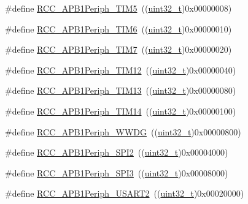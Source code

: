\begin{DoxyCompactItemize}
\item 
\#define \hyperlink{group___a_p_b1__peripheral_ga4905c26000a571fa01fc057fe31d254a}{R\+C\+C\+\_\+\+A\+P\+B1\+Periph\+\_\+\+T\+I\+M5}~((\hyperlink{_p_e___types_8h_a33594304e786b158f3fb30289278f5af}{uint32\+\_\+t})0x00000008)
\item 
\#define \hyperlink{group___a_p_b1__peripheral_ga4974e8b8f11d54fbc0bac1988ff6254c}{R\+C\+C\+\_\+\+A\+P\+B1\+Periph\+\_\+\+T\+I\+M6}~((\hyperlink{_p_e___types_8h_a33594304e786b158f3fb30289278f5af}{uint32\+\_\+t})0x00000010)
\item 
\#define \hyperlink{group___a_p_b1__peripheral_ga9415b0c46db5318bdee3f868c16b8d35}{R\+C\+C\+\_\+\+A\+P\+B1\+Periph\+\_\+\+T\+I\+M7}~((\hyperlink{_p_e___types_8h_a33594304e786b158f3fb30289278f5af}{uint32\+\_\+t})0x00000020)
\item 
\#define \hyperlink{group___a_p_b1__peripheral_ga0a4ec40233160ca20adaa571073e7bcd}{R\+C\+C\+\_\+\+A\+P\+B1\+Periph\+\_\+\+T\+I\+M12}~((\hyperlink{_p_e___types_8h_a33594304e786b158f3fb30289278f5af}{uint32\+\_\+t})0x00000040)
\item 
\#define \hyperlink{group___a_p_b1__peripheral_ga34397b722f46f31e898136fb51a7523a}{R\+C\+C\+\_\+\+A\+P\+B1\+Periph\+\_\+\+T\+I\+M13}~((\hyperlink{_p_e___types_8h_a33594304e786b158f3fb30289278f5af}{uint32\+\_\+t})0x00000080)
\item 
\#define \hyperlink{group___a_p_b1__peripheral_ga7100c45768eea1484f6fd519b53e287d}{R\+C\+C\+\_\+\+A\+P\+B1\+Periph\+\_\+\+T\+I\+M14}~((\hyperlink{_p_e___types_8h_a33594304e786b158f3fb30289278f5af}{uint32\+\_\+t})0x00000100)
\item 
\#define \hyperlink{group___a_p_b1__peripheral_gad84e40be78ddc40b8eae1c2b0898f6b1}{R\+C\+C\+\_\+\+A\+P\+B1\+Periph\+\_\+\+W\+W\+DG}~((\hyperlink{_p_e___types_8h_a33594304e786b158f3fb30289278f5af}{uint32\+\_\+t})0x00000800)
\item 
\#define \hyperlink{group___a_p_b1__peripheral_gaa21f1dfb4fcf241c6f85a048eaca29df}{R\+C\+C\+\_\+\+A\+P\+B1\+Periph\+\_\+\+S\+P\+I2}~((\hyperlink{_p_e___types_8h_a33594304e786b158f3fb30289278f5af}{uint32\+\_\+t})0x00004000)
\item 
\#define \hyperlink{group___a_p_b1__peripheral_gabb0b40e839ef7403b086482e89d56f35}{R\+C\+C\+\_\+\+A\+P\+B1\+Periph\+\_\+\+S\+P\+I3}~((\hyperlink{_p_e___types_8h_a33594304e786b158f3fb30289278f5af}{uint32\+\_\+t})0x00008000)
\item 
\#define \hyperlink{group___a_p_b1__peripheral_gaa69c77220b943a42a4bacb8a3bf87dd0}{R\+C\+C\+\_\+\+A\+P\+B1\+Periph\+\_\+\+U\+S\+A\+R\+T2}~((\hyperlink{_p_e___types_8h_a33594304e786b158f3fb30289278f5af}{uint32\+\_\+t})0x00020000)

\end{DoxyCompactItemize}
